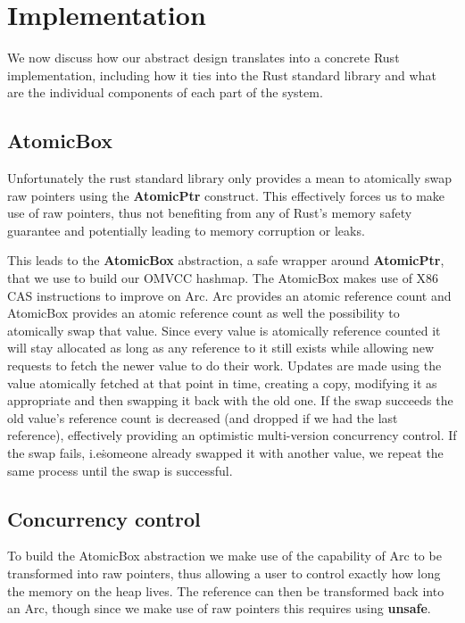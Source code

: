 \documentclass[11pt]{article}
\begin{document}
\section{Implementation}

We now discuss how our abstract design translates into a concrete Rust
implementation, including how it ties into the Rust standard library
and what are the individual components of each part of the system.

\subsection{AtomicBox}

Unfortunately the rust standard library only provides a mean to
atomically swap raw pointers using the \textbf{AtomicPtr}
construct. This effectively forces us to make use of raw pointers,
thus not benefiting from any of Rust's memory safety guarantee and
potentially leading to memory corruption or leaks.

This leads to the \textbf{AtomicBox} abstraction, a safe wrapper
around \textbf{AtomicPtr}, that we use to build our OMVCC hashmap.
The AtomicBox makes use of X86 CAS instructions to improve on Arc.
Arc provides an atomic reference count and AtomicBox provides an
atomic reference count as well the possibility to atomically swap that
value. Since every value is atomically reference counted it will stay
allocated as long as any reference to it still exists while allowing
new requests to fetch the newer value to do their work. Updates are
made using the value atomically fetched at that point in time,
creating a copy, modifying it as appropriate and then swapping it back
with the old one. If the swap succeeds the old value's reference count
is decreased (and dropped if we had the last reference), effectively
providing an optimistic multi-version concurrency control. If the swap
fails, i.e\. someone already swapped it with another value, we repeat
the same process until the swap is successful.

\subsection{Concurrency control}

To build the AtomicBox abstraction we make use of the capability of
Arc to be transformed into raw pointers, thus allowing a user to
control exactly how long the memory on the heap lives. The reference
can then be transformed back into an Arc, though since we make use of
raw pointers this requires using \textbf{unsafe}.
\end{document}
